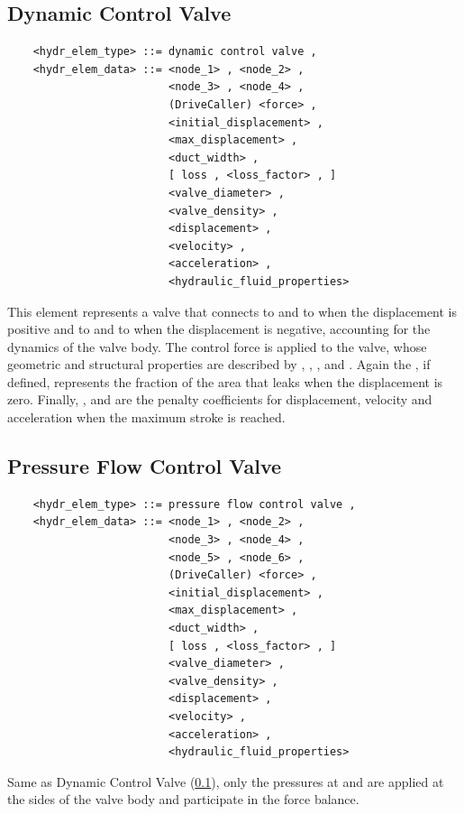 \subsection{Dynamic Control Valve}\label{sec:EL:HYDR:DYNAMIC_CONTROL_VALVE}
\begin{verbatim}
    <hydr_elem_type> ::= dynamic control valve ,
    <hydr_elem_data> ::= <node_1> , <node_2> ,
                         <node_3> , <node_4> ,
                         (DriveCaller) <force> ,
                         <initial_displacement> ,
                         <max_displacement> ,
                         <duct_width> ,
                         [ loss , <loss_factor> , ]
                         <valve_diameter> ,
                         <valve_density> ,
                         <displacement> ,
                         <velocity> ,
                         <acceleration> ,
                         <hydraulic_fluid_properties>
\end{verbatim}
This element represents a valve that connects
 to  and  to 
when the displacement is positive and  to 
and  to  when the displacement is negative,
accounting for the dynamics of the valve body.
The control force  is applied to the valve, whose 
geometric and structural properties are described by 
, ,
,  and .
Again the , if defined, represents the fraction
of the area that leaks when the displacement is zero.
Finally, ,  and 
are the penalty coefficients for displacement, velocity and acceleration
when the maximum stroke is reached.




\subsection{Pressure Flow Control Valve}
\begin{verbatim}
    <hydr_elem_type> ::= pressure flow control valve ,
    <hydr_elem_data> ::= <node_1> , <node_2> ,
                         <node_3> , <node_4> ,
                         <node_5> , <node_6> ,
                         (DriveCaller) <force> ,
                         <initial_displacement> ,
                         <max_displacement> ,
                         <duct_width> ,
                         [ loss , <loss_factor> , ]
                         <valve_diameter> ,
                         <valve_density> ,
                         <displacement> ,
                         <velocity> ,
                         <acceleration> ,
                         <hydraulic_fluid_properties>
\end{verbatim}
Same as Dynamic Control Valve (\ref{sec:EL:HYDR:DYNAMIC_CONTROL_VALVE}),
only the pressures at  and  are applied
at the sides of the valve body and participate in the force balance.



